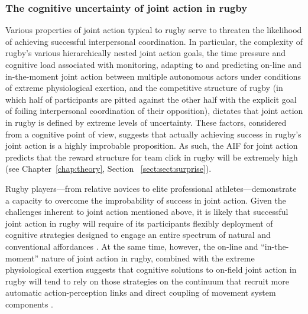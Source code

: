 \begin{CJK}{UTF8}{gbsn}
\subsubsection{The cognitive uncertainty of joint action in rugby}
Various properties of joint action typical to rugby serve to threaten the likelihood of achieving successful interpersonal coordination.  In particular, the complexity of rugby's various hierarchically nested joint action goals, the time pressure and cognitive load associated with monitoring, adapting to and predicting on-line and in-the-moment joint action between multiple autonomous actors under conditions of extreme physiological exertion, and the competitive structure of rugby (in which half of participants are pitted against the other half with the explicit goal of foiling interpersonal coordination of their opposition), dictates that joint action in rugby is defined by extreme levels of  uncertainty. These factors, considered from a cognitive point of view, suggests that actually achieving success in rugby's joint action is a highly improbable proposition. As such, the AIF for joint action predicts that the reward structure for team click in rugby will be extremely high (see Chapter~\ref{chap:theory}, Section ~\ref{sect:sect:surprise}).


Rugby players---from relative novices to elite professional athletes---demonstrate a capacity to overcome the improbability of success in joint action.  Given the challenges inherent to joint action mentioned above, it is likely that successful joint action in rugby will require of its participants flexibly deployment of cognitive strategies designed to engage an entire spectrum of natural and conventional affordances .  At the same time, however, the on-line and ``in-the-moment'' nature of joint action in rugby, combined with the extreme physiological exertion suggests that cognitive solutions to on-field joint action in rugby will tend to rely on those strategies on the continuum that recruit more automatic action-perception links and direct coupling of movement system components \citep{RKiouak2016,Novembre2014}.



\end{CJK}
